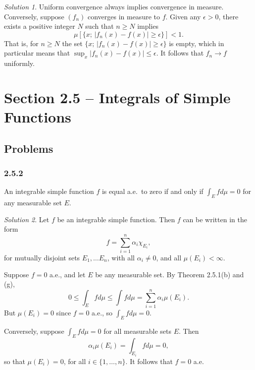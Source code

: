 \documentclass{report}
\theoremstyle{remark}
\newtheorem*{solution}{Solution}
\begin{document}
\begin{solution}
  Uniform convergence always implies convergence in measure. Conversely, suppose $(f_n)$ converges in measure to $f$. Given any $\epsilon > 0$, there exists a positive integer $N$ such that $n \ge N$ implies
  \begin{equation*}
    \mu \left[ \{x; \, |f_n(x) - f(x)| \ge \epsilon\} \right] < 1.
  \end{equation*}
  That is, for $n \ge N$ the set $\{x; \, |f_n(x) - f(x)| \ge \epsilon\}$ is empty, which in particular means that $\sup_x |f_n(x) - f(x)| \le \epsilon$. It follows that $f_n \to f$ uniformly.
\end{solution}

\section*{Section 2.5 -- Integrals of Simple Functions}

\subsection*{Problems}

\subsubsection*{2.5.2}
An integrable simple function $f$ is equal a.e.\ to zero if and only if $\int_E f d\mu = 0$ for any measurable set $E$.

\begin{solution}
  Let $f$ be an integrable simple function. Then $f$ can be written in the form
  \begin{equation*}
    f = \sum_{i=1}^n \alpha_i \chi_{E_i},
  \end{equation*}
  for mutually disjoint sets $E_1, \dots E_n$, with all $\alpha_i \ne 0$, and all $\mu(E_i) < \infty$.

  Suppose $f = 0$ a.e., and let $E$ be any measurable set. By Theorem 2.5.1(b) and (g),
  \begin{equation*}
    0 \le \int_E f d\mu \le \int f d\mu = \sum_{i=1}^n \alpha_i \mu(E_i).
  \end{equation*}
  But $\mu(E_i) = 0$ since $f = 0$ a.e., so $\int_E f d\mu = 0$.

  Conversely, suppose $\int_E f d\mu = 0$ for all measurable sets $E$. Then
  \begin{equation*}
    \alpha_i \mu(E_i) = \int_{E_i} f d\mu = 0,
  \end{equation*}
  so that $\mu(E_i) = 0$, for all $i \in \{1,\dots,n\}$. It follows that $f = 0$ a.e.
\end{solution}
\end{document}
